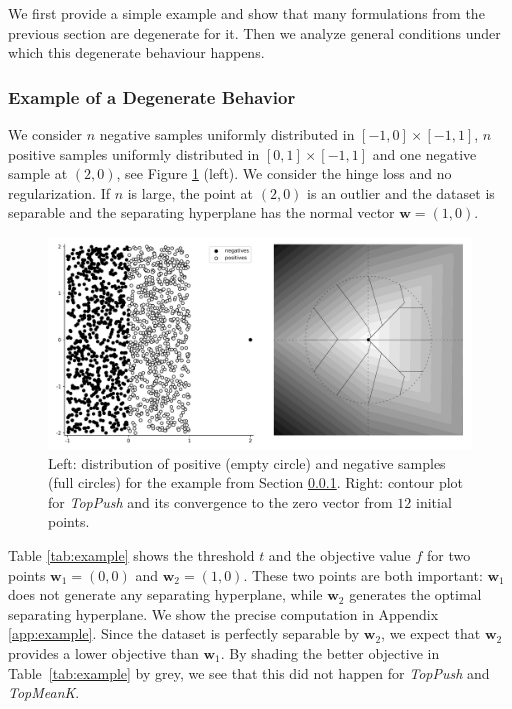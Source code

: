 \documentclass{Thesis}
\newcommand{\TopPush}{\emph{TopPush}\xspace}
\newcommand{\TopMeanK}{\emph{TopMeanK}\xspace}
\begin{document}
We first provide a simple example and show that many formulations from the previous section are degenerate for it. Then we analyze general conditions under which this degenerate behaviour happens.


\subsubsection{Example of a Degenerate Behavior}\label{sec:example}

We consider $n$ negative samples uniformly distributed in $[-1,0]\times[-1,1]$, $n$ positive samples uniformly distributed in $[0,1]\times[-1,1]$ and one negative sample at $(2,0)$, see Figure \ref{fig:example} (left). We consider the hinge loss and no regularization. If $n$ is large, the point at $(2,0)$ is an outlier and the dataset is separable and the separating hyperplane has the normal vector $\bm{w}=(1,0)$. 

\begin{figure}[!ht]
  \centering
  \includegraphics[width=0.7\linewidth]{figures/toppush_convergence.pdf}
  \caption{Left: distribution of positive (empty circle) and negative samples (full circles) for the example from Section \ref{sec:example}. Right: contour plot for \TopPush and its convergence to the zero vector from $12$ initial points.}
  \label{fig:example}
\end{figure}

Table \ref{tab:example} shows the threshold $t$ and the objective value $f$ for two points $\bm{w}_1=(0,0)$ and $\bm{w}_2=(1,0)$. These two points are both important: $\bm{w}_1$ does not generate any separating hyperplane, while $\bm{w}_2$ generates the optimal separating hyperplane. We show the precise computation in Appendix \ref{app:example}. Since the dataset is perfectly separable by $\bm{w}_2$, we expect that $\bm{w}_2$ provides a lower objective than $\bm{w}_1$. By shading the better objective in Table~\ref{tab:example} by grey, we see that this did not happen for \TopPush and \TopMeanK.
\end{document}
